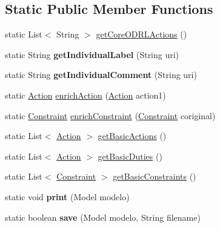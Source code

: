\subsection*{Static Public Member Functions}
\begin{DoxyCompactItemize}
\item 
static List$<$ String $>$ \hyperlink{classodrlmodel_1_1_r_d_f_utils_aa5ba71deae00f5e6fdf2019989c992ed}{get\-Core\-O\-D\-R\-L\-Actions} ()
\item 
\hypertarget{classodrlmodel_1_1_r_d_f_utils_aabe3570587849c1b57a8d6def3170c7d}{static String {\bfseries get\-Individual\-Label} (String uri)}\label{classodrlmodel_1_1_r_d_f_utils_aabe3570587849c1b57a8d6def3170c7d}

\item 
\hypertarget{classodrlmodel_1_1_r_d_f_utils_a72e3fc78f978e61fad2914802d0e2cdb}{static String {\bfseries get\-Individual\-Comment} (String uri)}\label{classodrlmodel_1_1_r_d_f_utils_a72e3fc78f978e61fad2914802d0e2cdb}

\item 
static \hyperlink{classodrlmodel_1_1_action}{Action} \hyperlink{classodrlmodel_1_1_r_d_f_utils_a2f50a747438b23a3570e0a9266327e22}{enrich\-Action} (\hyperlink{classodrlmodel_1_1_action}{Action} action1)
\item 
static \hyperlink{classodrlmodel_1_1_constraint}{Constraint} \hyperlink{classodrlmodel_1_1_r_d_f_utils_a9bcd3726b8c1b5445893ec78c40be15e}{enrich\-Constraint} (\hyperlink{classodrlmodel_1_1_constraint}{Constraint} coriginal)
\item 
static List$<$ \hyperlink{classodrlmodel_1_1_action}{Action} $>$ \hyperlink{classodrlmodel_1_1_r_d_f_utils_a7688338085fad38120729dda373eaa49}{get\-Basic\-Actions} ()
\item 
static List$<$ \hyperlink{classodrlmodel_1_1_action}{Action} $>$ \hyperlink{classodrlmodel_1_1_r_d_f_utils_ac659a8fb209fa1afeb06fe9dbaa0ae8e}{get\-Basic\-Duties} ()
\item 
static List$<$ \hyperlink{classodrlmodel_1_1_constraint}{Constraint} $>$ \hyperlink{classodrlmodel_1_1_r_d_f_utils_a157ceb5999c149124ae840b86ab1eeef}{get\-Basic\-Constraints} ()
\item 
\hypertarget{classodrlmodel_1_1_r_d_f_utils_ac4e66a6467849b55a54494602f1b7cf4}{static void {\bfseries print} (Model modelo)}\label{classodrlmodel_1_1_r_d_f_utils_ac4e66a6467849b55a54494602f1b7cf4}

\item 
\hypertarget{classodrlmodel_1_1_r_d_f_utils_a66375620306250accde6e2e4f5b977cc}{static boolean {\bfseries save} (Model modelo, String filename)}\label{classodrlmodel_1_1_r_d_f_utils_a66375620306250accde6e2e4f5b977cc}


\end{DoxyCompactItemize}
